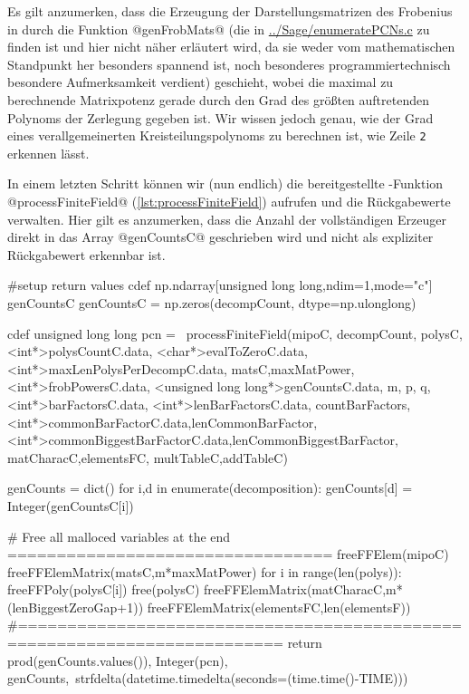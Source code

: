 Es gilt anzumerken, dass die Erzeugung der Darstellungsmatrizen des Frobenius
in \Clang durch die Funktion @genFrobMats@ 
(die in \url{../Sage/enumeratePCNs.c} zu finden ist und hier nicht näher
erläutert wird, da sie weder vom mathematischen Standpunkt her besonders
spannend ist, noch besonderes programmiertechnisch besondere Aufmerksamkeit
verdient)
geschieht, wobei die maximal zu berechnende
Matrixpotenz gerade durch den Grad des größten auftretenden Polynoms der
Zerlegung gegeben ist. Wir wissen jedoch genau, wie der Grad eines
verallgemeinerten Kreisteilungspolynoms zu berechnen ist, wie Zeile
\texttt{2} erkennen lässt.

In einem letzten Schritt können wir (nun endlich) die bereitgestellte
\Clang-Funktion @processFiniteField@ (\autoref{lst:processFiniteField}) 
aufrufen und die Rückgabewerte verwalten. Hier gilt es anzumerken, dass die
Anzahl der vollständigen Erzeuger direkt in das Array @genCountsC@ geschrieben
wird und nicht als expliziter Rückgabewert erkennbar ist.


\begin{sagecode}[caption={\texttt{countCompleteSubmoduleGenerators}
  Fortsetzung (IV)}]
    #setup return values
    cdef np.ndarray[unsigned long long,ndim=1,mode="c"] genCountsC
    genCountsC = np.zeros(decompCount, dtype=np.ulonglong)

    cdef unsigned long long pcn = \
            processFiniteField(mipoC, decompCount,
                    polysC,<int*>polysCountC.data,
                    <char*>evalToZeroC.data,
                    <int*>maxLenPolysPerDecompC.data,
                    matsC,maxMatPower,<int*>frobPowersC.data,
                    <unsigned long long*>genCountsC.data, m, p, q,
                    <int*>barFactorsC.data, <int*>lenBarFactorsC.data,
                    countBarFactors,
                    <int*>commonBarFactorC.data,lenCommonBarFactor,
                    <int*>commonBiggestBarFactorC.data,lenCommonBiggestBarFactor,
                    matCharacC,elementsFC,
                    multTableC,addTableC)

    genCounts = dict()
    for i,d in enumerate(decomposition):
        genCounts[d] = Integer(genCountsC[i])

    # Free all malloced variables at the end =================================
    freeFFElem(mipoC)
    freeFFElemMatrix(matsC,m*maxMatPower)
    for i in range(len(polys)):
        freeFFPoly(polysC[i])
    free(polysC)
    freeFFElemMatrix(matCharacC,m*(lenBiggestZeroGap+1))
    freeFFElemMatrix(elementsFC,len(elementsF))
    #=========================================================================
    return prod(genCounts.values()), Integer(pcn), genCounts,\
            strfdelta(datetime.timedelta(seconds=(time.time()-TIME)))
\end{sagecode}


